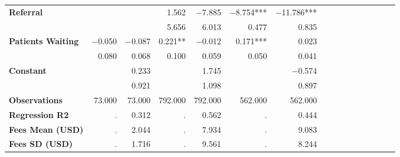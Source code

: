 \begin{tabular}{@{\extracolsep{5pt}}lrrrrrrrrrrrrrrr}
{\bf Referral} & \phantom{***} & \phantom{***} & 1.562\phantom{\phantom{)}***} & $-$7.885\phantom{\phantom{)}***} & $-$8.754\phantom{)}*** & $-$11.786\phantom{)}*** \\
{\bf } & \phantom{***} & \phantom{***} & 5.656\phantom{\phantom{)}***} & 6.013\phantom{\phantom{)}***} & 0.477\phantom{\phantom{)}***} & 0.835\phantom{\phantom{)}***} \\
{\bf Patients Waiting} & $-$0.050\phantom{\phantom{)}***} & $-$0.087\phantom{\phantom{)}***} & 0.221\phantom{)}**\phantom{*} & $-$0.012\phantom{\phantom{)}***} & 0.171\phantom{)}*** & 0.023\phantom{\phantom{)}***} \\
{\bf } & 0.080\phantom{\phantom{)}***} & 0.068\phantom{\phantom{)}***} & 0.100\phantom{\phantom{)}***} & 0.059\phantom{\phantom{)}***} & 0.050\phantom{\phantom{)}***} & 0.041\phantom{\phantom{)}***} \\
{\bf Constant} & \phantom{***} & 0.233\phantom{\phantom{)}***} & \phantom{***} & 1.745\phantom{\phantom{)}***} & \phantom{***} & $-$0.574\phantom{\phantom{)}***} \\
{\bf } & \phantom{***} & 0.921\phantom{\phantom{)}***} & \phantom{***} & 1.098\phantom{\phantom{)}***} & \phantom{***} & 0.897\phantom{\phantom{)}***} \\
{\bf Observations} & 73.000\phantom{\phantom{)}***} & 73.000\phantom{\phantom{)}***} & 792.000\phantom{\phantom{)}***} & 792.000\phantom{\phantom{)}***} & 562.000\phantom{\phantom{)}***} & 562.000\phantom{\phantom{)}***} \\
{\bf Regression R2} & .\phantom{***} & 0.312\phantom{***} & .\phantom{***} & 0.562\phantom{***} & .\phantom{***} & 0.444\phantom{***} \\
{\bf Fees Mean (USD)} & .\phantom{***} & 2.044\phantom{***} & .\phantom{***} & 7.934\phantom{***} & .\phantom{***} & 9.083\phantom{***} \\
{\bf Fees SD (USD)} & .\phantom{***} & 1.716\phantom{***} & .\phantom{***} & 9.561\phantom{***} & .\phantom{***} & 8.244\phantom{***} \\
\hline
\end{tabular}
